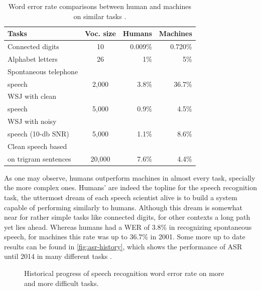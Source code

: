\begin{table}[!ht]
  \caption[Word error rate comparisons between human and machines on similar tasks \citep{Huang2001}.]{Word error rate comparisons between human and machines on similar tasks \citep{Huang2001}.}
  \smallskip
  \centering
  \begin{tabular}{lcrr} \toprule
      \textbf{Tasks} & \textbf{Voc. size} & \textbf{Humans} & \textbf{Machines} \\ \midrule
      \small Connected digits & 10 & 0.009\% & 0.720\% \\
      \small Alphabet letters & 26 & 1\% & 5\% \\
      \small Spontaneous telephone \\ speech & 2,000 & 3.8\% & 36.7\% \\
      \small WSJ with clean \\ \small speech & 5,000 & 0.9\% & 4.5\% \\
      \small WSJ with noisy \\ \small speech (10-db SNR) & 5,000 & 1.1\% & 8.6\% \\
      \small Clean speech based \\ \small on trigram sentences & 20,000 & 7.6\% & 4.4\% \\
    \bottomrule
  \end{tabular}
  \label{tab:comparison-human-mach}
\end{table}

As one may observe, humans outperform machines in almost every task, specially the more complex ones. 
Humans' are indeed the topline for the speech recognition task, the uttermost dream of each speech 
scientist alive is to build a system capable of performing similarly to humans. Although this dream is somewhat near
for rather simple tasks like connected digits, for other contexts a long path yet lies ahead. Whereas humans had a WER of 3.8\% in recognizing spontaneous speech, for machines this rate was up to 36.7\% in 2001. Some more up to date results can be found in \autoref{fig:asr-history}, which shows the performance of \ac{ASR} until 2014 in many different tasks \cite{Huang2014}. 

\begin{figure}[!ht]
        \noindent{}
        \caption{Historical progress of speech recognition word error rate on more and more
difficult tasks.}
        \label{fig:asr-history}
\end{figure}

